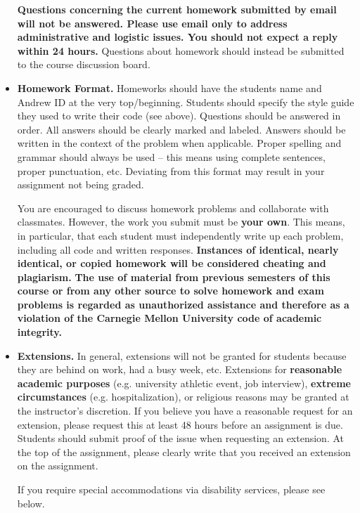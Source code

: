 \documentclass[11pt]{article}
\begin{document}
\begin{itemize}
{\bf Questions concerning the current homework submitted by email will not be answered. Please use email only to address administrative and logistic issues. You should not expect a reply within 24 hours.}  Questions about homework should instead be submitted to the course discussion board.


\item {\bf Homework Format.}  Homeworks should have the students name and Andrew ID at the very top/beginning.  Students should specify the style guide they used to write their code (see above).  Questions should be answered in order.  All answers should be clearly marked and labeled.  Answers should be written in the context of the problem when applicable.  Proper spelling and grammar should always be used -- this means using complete sentences, proper punctuation, etc.  Deviating from this format may result in your assignment not being graded.

You are encouraged to discuss homework problems and collaborate with classmates.  However, the work you submit must be {\bf your own}.  This means, in
particular, that each student must independently write up each problem, including all code and written responses.  {\bf Instances of identical, nearly identical, or copied homework will be considered cheating and plagiarism.}  {\bf The use of material from previous semesters of this course or from any other source to solve homework and exam problems is regarded as unauthorized assistance and therefore as a violation of the Carnegie Mellon University code of academic integrity.}


\item {\bf Extensions.}  In general, extensions will not be granted for students because they are behind on work, had a busy week, etc.  Extensions for \textbf{reasonable academic purposes} (e.g. university athletic event, job interview), \textbf{extreme circumstances} (e.g. hospitalization), or religious reasons may be granted at the instructor's discretion.  If you believe you have a reasonable request for an extension, please request this at least 48 hours before an assignment is due.  Students should submit proof of the issue when requesting an extension.  At the top of the assignment, please clearly write that you received an extension on the assignment.

If you require special accommodations via disability services, please see below.



\end{itemize}
\end{document}
